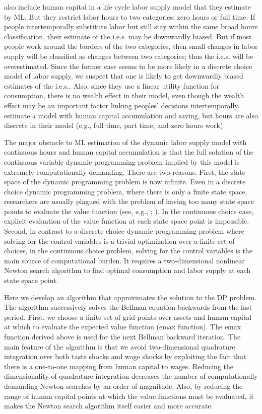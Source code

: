 \documentclass[\econtexRoot/ImaiKeane]{subfiles}
\begin{document}
\cite{Eckstein1989-ji} also include human capital in a life cycle labor supply model that they estimate by ML. But they restrict labor hours to two categories: zero hours or full time. If people intertemporally substitute labor but still stay within the same broad hours classification, their estimate of the i.e.s. may be downwardly biased. But if most people work around the borders of the two categories, then small changes in labor supply will be classified as changes between two categories; thus the i.e.s. will be overestimated. Since the former case seems to be more likely in a discrete choice model of labor supply, we suspect that one is likely to get downwardly biased estimates of the i.e.s.. Also, since they use a linear utility function for consumption, there is no wealth effect in their model, even though the wealth effect may be an important factor linking peoples' decisions intertemporally. \cite{Keane2001-yk} estimate a model with human capital accumulation and saving, but hours are also discrete in their model (e.g., full time, part time, and zero hours work). \par
The major obstacle to ML estimation of the dynamic labor supply model with continuous hours and human capital accumulation is that the full solution of the continuous variable dynamic programming problem implied by this model is extremely computationally demanding. There are two reasons. First, the state space of the dynamic programming problem is now infinite. Even in a discrete choice dynamic programming problem, where there is only a finite state space, researchers are usually plagued with the problem of having too many state space points to evaluate the value function (see, e.g., \cite{Geweke2001-px}; \cite{Keane1994-sm}). In the continuous choice case, explicit evaluation of the value function at each state space point is impossible. Second, in contrast to a discrete choice dynamic programming problem where solving for the control variables is a trivial optimization over a finite set of choices, in the continuous choice problem, solving for the control variables is the main source of computational burden. It requires a two-dimensional nonlinear Newton search algorithm to find optimal consumption and labor supply at each state space point. \par
Here we develop an algorithm that approximates the solution to the DP problem. The algorithm successively solves the Bellman equation backwards from the last period. First, we choose a finite set of grid points over assets and human capital at which to evaluate the expected value function (emax function). The emax function derived above is used for the next Bellman backward iteration. The main feature of the algorithm is that we avoid two-dimensional quadrature integration over both taste shocks and wage shocks by exploiting the fact that there is a one-to-one mapping from human capital to wages. Reducing the dimensionality of quadrature integration decreases the number of computationally demanding Newton searches by an order of magnitude. Also, by reducing the range of human capital points at which the value functions must be evaluated, it makes the Newton search algorithm itself easier and more accurate. \par
\end{document}
